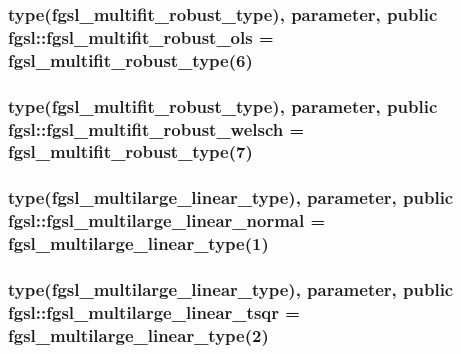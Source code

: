 \subsubsection[{fgsl\+\_\+multifit\+\_\+robust\+\_\+ols}]{\setlength{\rightskip}{0pt plus 5cm}type({\bf fgsl\+\_\+multifit\+\_\+robust\+\_\+type}), parameter, public fgsl\+::fgsl\+\_\+multifit\+\_\+robust\+\_\+ols = {\bf fgsl\+\_\+multifit\+\_\+robust\+\_\+type}(6)}\label{namespacefgsl_a21550651577589ca5adf0cdd17517848}
\hypertarget{namespacefgsl_a5d48e88448a37e7bdc7af12abc799a83}{}
\subsubsection[{fgsl\+\_\+multifit\+\_\+robust\+\_\+welsch}]{\setlength{\rightskip}{0pt plus 5cm}type({\bf fgsl\+\_\+multifit\+\_\+robust\+\_\+type}), parameter, public fgsl\+::fgsl\+\_\+multifit\+\_\+robust\+\_\+welsch = {\bf fgsl\+\_\+multifit\+\_\+robust\+\_\+type}(7)}\label{namespacefgsl_a5d48e88448a37e7bdc7af12abc799a83}
\hypertarget{namespacefgsl_ae183ddeba0c0b5b8bc4ca6508e63519b}{}
\subsubsection[{fgsl\+\_\+multilarge\+\_\+linear\+\_\+normal}]{\setlength{\rightskip}{0pt plus 5cm}type({\bf fgsl\+\_\+multilarge\+\_\+linear\+\_\+type}), parameter, public fgsl\+::fgsl\+\_\+multilarge\+\_\+linear\+\_\+normal = {\bf fgsl\+\_\+multilarge\+\_\+linear\+\_\+type}(1)}\label{namespacefgsl_ae183ddeba0c0b5b8bc4ca6508e63519b}
\hypertarget{namespacefgsl_a15f9b6d29fecabfb8a34b6d5ea69a87b}{}
\subsubsection[{fgsl\+\_\+multilarge\+\_\+linear\+\_\+tsqr}]{\setlength{\rightskip}{0pt plus 5cm}type({\bf fgsl\+\_\+multilarge\+\_\+linear\+\_\+type}), parameter, public fgsl\+::fgsl\+\_\+multilarge\+\_\+linear\+\_\+tsqr = {\bf fgsl\+\_\+multilarge\+\_\+linear\+\_\+type}(2)}\label{namespacefgsl_a15f9b6d29fecabfb8a34b6d5ea69a87b}
\hypertarget{namespacefgsl_a94fc756d777c9358f808374b01e6a879}{}
